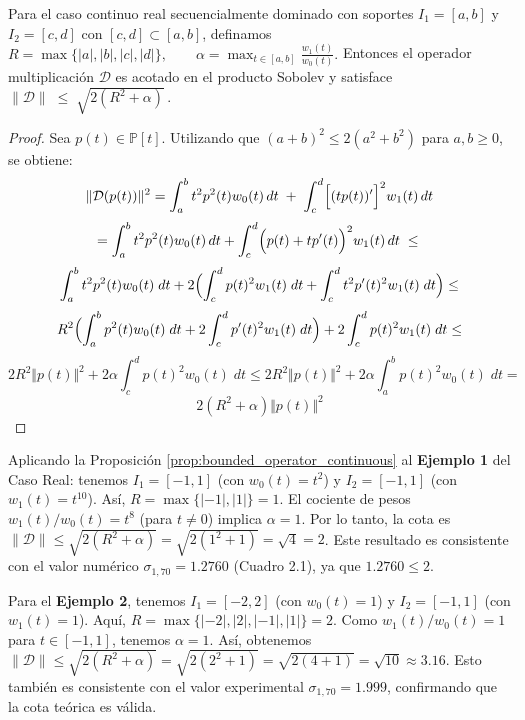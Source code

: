 \begin{proposition}\label{prop:bounded_operator_continuous}
  Para el caso continuo real secuencialmente dominado con soportes $I_1=[a,b]$ y $I_2=[c,d]$ con $[c,d] \subset [a,b]$, definamos
  \(
  R = \max\{|a|,|b|,|c|,|d|\},
  \qquad
  \alpha = \max_{t\in[a,b]}\frac{w_1(t)}{w_0(t)}.
  \)
  Entonces el operador multiplicación $\mathcal{D}$
  es acotado en el producto Sobolev y satisface
  \(
  \|\mathcal{D}\|\;\le\;\sqrt{2(R^{2}+\alpha)}\,.
  \)
\end{proposition}

\begin{proof}
  Sea $p(t)\in\mathbb{P}[t]$.
  \noindent Utilizando que $(a+b)^2\leq 2(a^2+b^2)$ para $a,b\ge0$, se obtiene:
  $$
    \Vert \mathcal{D}(p(t))\Vert^{2}
    = \int_{a}^{b} t^2 p^2(t) w_0(t)\,dt
    \;+\;\int_{c}^{d} \Bigl[(tp(t))'\Bigr]^2 w_1(t)\,dt
  $$
  $$
    = \int_{a}^{b} t^2 p^2(t) w_0(t)\,dt
    + \int_{c}^{d} \Bigl(p(t)+tp'(t)\Bigr)^2 w_1(t)\,dt
    \;\le\;
  $$
  $$
    \int_{a}^{b} t^2p^2(t)w_0(t)\; dt+2\Bigl(\int_{c}^{d} p(t)^2w_1(t)\; dt +\int_{c}^{d} t^2p'(t)^2w_1(t)\; dt\Bigr) \leq
  $$
  $$
    R^{2} \Bigl(\int_{a}^{b} p^2(t)w_0(t)\; dt +  2\int_{c}^{d} p'(t)^2w_1(t)\; dt\Bigr)+ 2\int_{c}^{d} p(t)^2w_1(t)\; dt \leq
  $$
  $$
    2R^{2} \Vert p(t)\Vert^{2} + 2\alpha \int_{c}^{d} p(t)^2w_0(t)\; dt \leq 2R^{2} \Vert p(t)\Vert^{2} + 2\alpha \int_{a}^{b} p(t)^2w_0(t)\; dt =
  $$
  $$
    2(R^{2}+\alpha)\Vert p(t) \Vert^{2}
  $$

\end{proof}

\noindent Aplicando la Proposición \ref{prop:bounded_operator_continuous} al \textbf{Ejemplo 1} del Caso Real: tenemos $I_1 = [-1,1]$ (con $w_0(t)=t^2$) y $I_2 = [-1,1]$ (con $w_1(t)=t^{10}$). Así, $R = \max\{|-1|,|1|\} = 1$. El cociente de pesos $w_1(t)/w_0(t) = t^8$ (para $t \neq 0$) implica $\alpha = 1$. Por lo tanto, la cota es $\|\mathcal{D}\| \le \sqrt{2(R^2 + \alpha)} = \sqrt{2(1^2 + 1)} = \sqrt{4} = 2$. Este resultado es consistente con el valor numérico $\sigma_{1,70} = 1.2760$ (Cuadro 2.1), ya que $1.2760 \le 2$.

\noindent Para el \textbf{Ejemplo 2}, tenemos $I_1 = [-2,2]$ (con $w_0(t)=1$) y $I_2 = [-1,1]$ (con $w_1(t)=1$). Aquí, $R = \max\{|-2|,|2|,|-1|,|1|\} = 2$. Como $w_1(t)/w_0(t) = 1$ para $t \in [-1,1]$, tenemos $\alpha = 1$. Así, obtenemos $\|\mathcal{D}\| \le \sqrt{2(R^2 + \alpha)} = \sqrt{2(2^2 + 1)} = \sqrt{2(4 + 1)} = \sqrt{10} \approx 3.16$. Esto también es consistente con el valor experimental $\sigma_{1,70} = 1.999$, confirmando que la cota teórica es válida.

